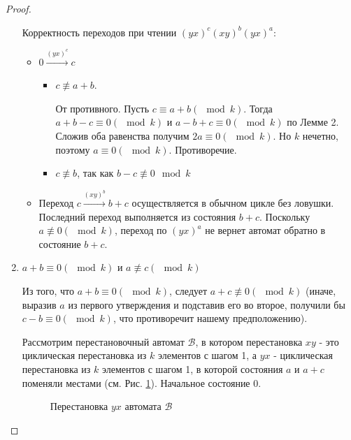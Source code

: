 \documentclass{article}
\begin{document}
\begin{proof}
\begin{enumerate}
			Корректность переходов при чтении $(yx)^c(xy)^b(yx)^a$:
			\begin{itemize}
				\item $0 \xrightarrow{(yx)^c} c$
				\begin{itemize}
					\item $c \not \equiv a+b$. 
					
					От противного. Пусть $c \equiv a+b (\mod k)$. Тогда $a+b-c \equiv 0 (\mod k)$ и $a-b+c \equiv 0 (\mod k)$ по Лемме 2. Сложив оба равенства получим $2a \equiv 0 (\mod k)$. Но $k$ нечетно, поэтому $a \equiv 0 (\mod k)$. Противоречие.
					\item $c \not \equiv b$, так как $b-c \not \equiv 0 \mod k$
				\end{itemize}
				\item Переход $c \xrightarrow{(xy)^b} b+c$ осуществляется в обычном цикле без ловушки. Последний переход выполняется из состояния $b+c$. Поскольку $a \not \equiv 0 (\mod k)$, переход по $(yx)^a$ не вернет автомат обратно в состояние $b+c$. 
			\end{itemize}
		
			\item $a+b \equiv 0 (\mod k)$ и $a \not \equiv c (\mod k)$
			
			Из того, что $a+b \equiv 0 (\mod k)$, следует $a+c \not \equiv 0 (\mod k)$ (иначе, выразив $a$ из первого утверждения и подставив его во второе, получили бы $c-b \equiv 0 (\mod k)$, что противоречит нашему предположению).
			
			Рассмотрим перестановочный автомат $\mathscr{B}$, в котором  перестановка $xy$ - это циклическая перестановка из $k$ элементов с шагом 1, а $yx$ - циклическая перестановка из $k$ элементов с шагом 1, в которой состояния $a$ и $a+c$ поменяли местами (см. Рис. \ref{cycle_a+c_a}). Начальное состояние 0.
			
			\begin{figure}
				\caption{Перестановка $yx$ автомата $\mathscr{B}$}
				\label{cycle_a+c_a}
			\end{figure}
		

\end{enumerate}
\end{proof}
\end{document}
